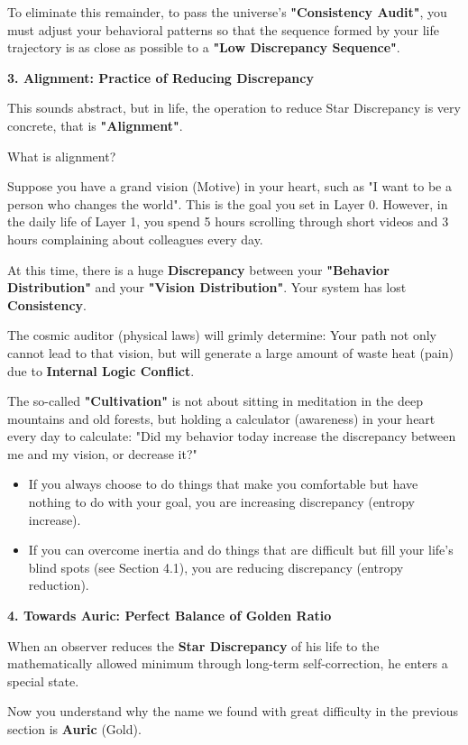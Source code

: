 To eliminate this remainder, to pass the universe's \textbf{"Consistency Audit"}, you must adjust your behavioral patterns so that the sequence formed by your life trajectory is as close as possible to a \textbf{"Low Discrepancy Sequence"}.

\textbf{3. Alignment: Practice of Reducing Discrepancy}

This sounds abstract, but in life, the operation to reduce Star Discrepancy is very concrete, that is \textbf{"Alignment"}.

What is alignment?

Suppose you have a grand vision (Motive) in your heart, such as "I want to be a person who changes the world". This is the goal you set in Layer 0.
However, in the daily life of Layer 1, you spend 5 hours scrolling through short videos and 3 hours complaining about colleagues every day.

At this time, there is a huge \textbf{Discrepancy} between your \textbf{"Behavior Distribution"} and your \textbf{"Vision Distribution"}. Your system has lost \textbf{Consistency}.

The cosmic auditor (physical laws) will grimly determine: Your path not only cannot lead to that vision, but will generate a large amount of waste heat (pain) due to \textbf{Internal Logic Conflict}.

The so-called \textbf{"Cultivation"} is not about sitting in meditation in the deep mountains and old forests, but holding a calculator (awareness) in your heart every day to calculate:
"Did my behavior today increase the discrepancy between me and my vision, or decrease it?"

\begin{itemize}
\item If you always choose to do things that make you comfortable but have nothing to do with your goal, you are increasing discrepancy (entropy increase).
\item If you can overcome inertia and do things that are difficult but fill your life's blind spots (see Section 4.1), you are reducing discrepancy (entropy reduction).
\end{itemize}

\textbf{4. Towards Auric: Perfect Balance of Golden Ratio}

When an observer reduces the \textbf{Star Discrepancy} of his life to the mathematically allowed minimum through long-term self-correction, he enters a special state.

Now you understand why the name we found with great difficulty in the previous section is \textbf{Auric} (Gold).

